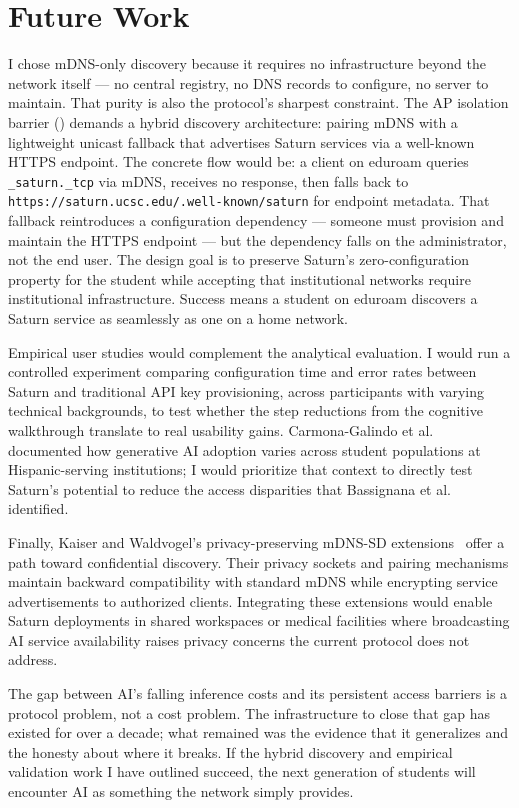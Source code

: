 \section{Future Work}
\label{sec:future-work}

I chose mDNS-only discovery because it requires no infrastructure beyond the network itself --- no central registry, no DNS records to configure, no server to maintain. That purity is also the protocol's sharpest constraint. The AP isolation barrier () demands a hybrid discovery architecture: pairing mDNS with a lightweight unicast fallback that advertises Saturn services via a well-known HTTPS endpoint. The concrete flow would be: a client on eduroam queries \texttt{\_saturn.\_tcp} via mDNS, receives no response, then falls back to \texttt{https://saturn.ucsc.edu/.well-known/saturn} for endpoint metadata. That fallback reintroduces a configuration dependency --- someone must provision and maintain the HTTPS endpoint --- but the dependency falls on the administrator, not the end user. The design goal is to preserve Saturn's zero-configuration property for the student while accepting that institutional networks require institutional infrastructure. Success means a student on eduroam discovers a Saturn service as seamlessly as one on a home network.

Empirical user studies would complement the analytical evaluation. I would run a controlled experiment comparing configuration time and error rates between Saturn and traditional API key provisioning, across participants with varying technical backgrounds, to test whether the step reductions from the cognitive walkthrough translate to real usability gains. Carmona-Galindo et al.~\cite{carmona2025hsi} documented how generative AI adoption varies across student populations at Hispanic-serving institutions; I would prioritize that context to directly test Saturn's potential to reduce the access disparities that Bassignana et al.~\cite{bassignana2025aigap} identified.

Finally, Kaiser and Waldvogel's privacy-preserving mDNS-SD extensions~\cite{kaiser2014efficient} offer a path toward confidential discovery. Their privacy sockets and pairing mechanisms maintain backward compatibility with standard mDNS while encrypting service advertisements to authorized clients. Integrating these extensions would enable Saturn deployments in shared workspaces or medical facilities where broadcasting AI service availability raises privacy concerns the current protocol does not address.

The gap between AI's falling inference costs and its persistent access barriers is a protocol problem, not a cost problem. The infrastructure to close that gap has existed for over a decade; what remained was the evidence that it generalizes and the honesty about where it breaks. If the hybrid discovery and empirical validation work I have outlined succeed, the next generation of students will encounter AI as something the network simply provides.
